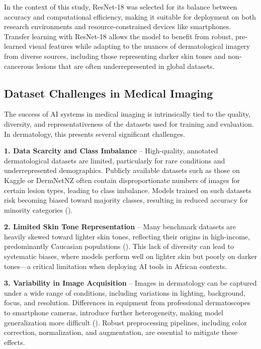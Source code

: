 \documentclass[
  12pt,
  oneside]{article}
\begin{document}
In the context of this study, ResNet-18 was selected for its balance
between accuracy and computational efficiency, making it suitable for
deployment on both research environments and resource-constrained
devices like smartphones. Transfer learning with ResNet-18 allows the
model to benefit from robust, pre-learned visual features while adapting
to the nuances of dermatological imagery from diverse sources, including
those representing darker skin tones and non-cancerous lesions that are
often underrepresented in global datasets.

\subsection{Dataset Challenges in Medical
Imaging}\label{dataset-challenges-in-medical-imaging}

The success of AI systems in medical imaging is intrinsically tied to
the quality, diversity, and representativeness of the datasets used for
training and evaluation. In dermatology, this presents several
significant challenges.

\textbf{1. Data Scarcity and Class Imbalance} -- High-quality, annotated
dermatological datasets are limited, particularly for rare conditions
and underrepresented demographics. Publicly available datasets such as
those on Kaggle or DermNetNZ often contain disproportionate numbers of
images for certain lesion types, leading to class imbalance. Models
trained on such datasets risk becoming biased toward majority classes,
resulting in reduced accuracy for minority categories
().

\textbf{2. Limited Skin Tone Representation} -- Many benchmark datasets
are heavily skewed toward lighter skin tones, reflecting their origins
in high-income, predominantly Caucasian populations
(). This lack of
diversity can lead to systematic biases, where models perform well on
lighter skin but poorly on darker tones---a critical limitation when
deploying AI tools in African contexts.

\textbf{3. Variability in Image Acquisition} -- Images in dermatology
can be captured under a wide range of conditions, including variations
in lighting, background, focus, and resolution. Differences in equipment
from professional dermatoscopes to smartphone cameras, introduce further
heterogeneity, making model generalization more difficult
(). Robust preprocessing
pipelines, including color correction, normalization, and augmentation,
are essential to mitigate these effects.
\end{document}
